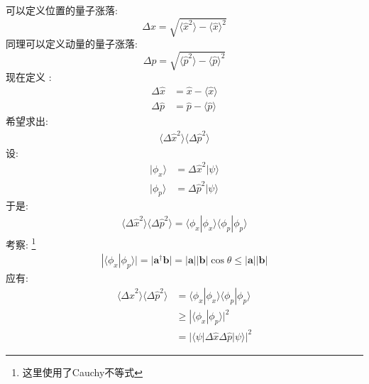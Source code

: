        可以定义位置的量子涨落: 
        \begin{equation}
            \Delta x = \sqrt{\langle \hat{x}^2 \rangle - \langle \hat{x} \rangle^2}
        \end{equation}
        同理可以定义动量的量子涨落: 
        \begin{equation}
            \Delta p = \sqrt{\langle \hat{p}^2 \rangle - \langle \hat{p} \rangle^2}
        \end{equation}
        现在定义 : 
        \begin{equation}\begin{aligned}
            \Delta \hat{x} &= \hat{x} - \langle \hat{x} \rangle \\
            \Delta \hat{p} &= \hat{p} - \langle \hat{p} \rangle
        \end{aligned}\end{equation}
        希望求出: 
        \begin{equation}\begin{aligned}
            \langle \Delta \hat{x}^2\rangle\langle \Delta \hat{p}^2\rangle
        \end{aligned}\end{equation}
        设: 
        \begin{equation}\begin{aligned}
            |\phi_x \rangle &= \Delta \hat{x}^2|\psi\rangle\\
            |\phi_p \rangle &= \Delta \hat{p}^2|\psi\rangle
        \end{aligned}\end{equation}
        于是: 
        \begin{equation}\begin{aligned}
            \langle \Delta \hat{x}^2\rangle\langle \Delta \hat{p}^2\rangle = \langle \phi_x | \phi_x \rangle \langle \phi_p | \phi_p \rangle
        \end{aligned}\end{equation}
        考察: 
        \footnote{这里使用了Cauchy不等式}
        \begin{equation}\begin{aligned}
            |\langle \phi_x | \phi_p \rangle| = |\bm{a}^\dagger \bm{b}| = |\bm{a}||\bm{b}|\cos{\theta} \leqslant |\bm{a}||\bm{b}|
        \end{aligned}\end{equation}
        应有: 
        \begin{equation}\begin{aligned}
            \langle \Delta \hat{x}^2\rangle\langle \Delta \hat{p}^2\rangle &= \langle \phi_x | \phi_x \rangle \langle \phi_p | \phi_p \rangle\\ &\geqslant |\langle \phi_x|\phi_p \rangle|^2\\
            &= |\langle \psi |\Delta \hat{x} \Delta \hat{p}|\psi \rangle|^2
        \end{aligned}\end{equation}
